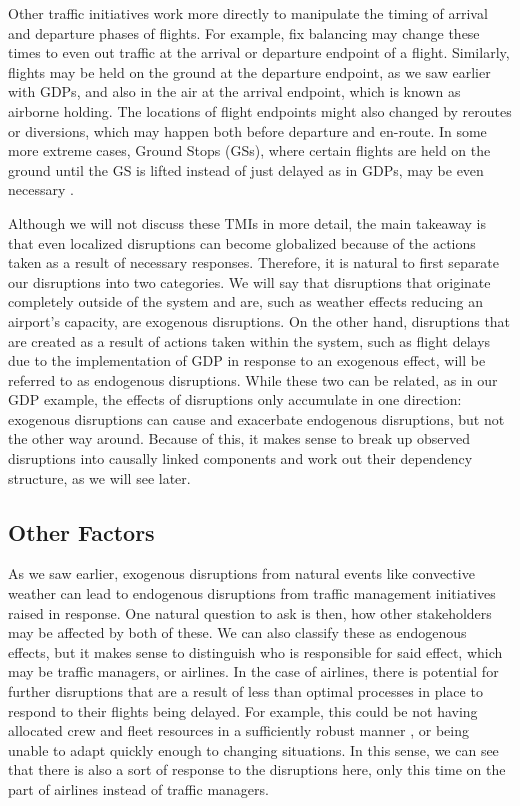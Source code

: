 Other traffic initiatives work more directly to manipulate the timing of arrival and departure phases of flights. For example, fix balancing may change these times to even out traffic at the arrival or departure endpoint of a flight. Similarly, flights may be held on the ground at the departure endpoint, as we saw earlier with GDPs, and also in the air at the arrival endpoint, which is known as airborne holding. The locations of flight endpoints might also changed by reroutes or diversions, which may happen both before departure and en-route. In some more extreme cases, Ground Stops (GSs), where certain flights are held on the ground until the GS is lifted instead of just delayed as in GDPs, may be even necessary \cite{faa_tmi_2024}.

Although we will not discuss these TMIs in more detail, the main takeaway is that even localized disruptions can become globalized because of the actions taken as a result of necessary responses. Therefore, it is natural to first separate our disruptions into two categories. We will say that disruptions that originate completely outside of the system and are, such as weather effects reducing an airport's capacity, are exogenous disruptions. On the other hand, disruptions that are created as a result of actions taken within the system, such as flight delays due to the implementation of GDP in response to an exogenous effect, will be referred to as endogenous disruptions. While these two can be related, as in our GDP example, the effects of disruptions only accumulate in one direction: exogenous disruptions can cause and exacerbate endogenous disruptions, but not the other way around. Because of this, it makes sense to break up observed disruptions into causally linked components and work out their dependency structure, as we will see later.

\subsection{Other Factors}

As we saw earlier, exogenous disruptions from natural events like convective weather can lead to endogenous disruptions from traffic management initiatives raised in response. One natural question to ask is then, how other stakeholders may be affected by both of these. We can also classify these as endogenous effects, but it makes sense to distinguish who is responsible for said effect, which may be traffic managers, or airlines. In the case of airlines, there is potential for further disruptions that are a result of less than optimal processes in place to respond to their flights being delayed. For example, this could be not having allocated crew and fleet resources in a sufficiently robust manner \cite{dot_penalizes_2023}, or being unable to adapt quickly enough to changing situations. In this sense, we can see that there is also a sort of response to the disruptions here, only this time on the part of airlines instead of traffic managers. 

